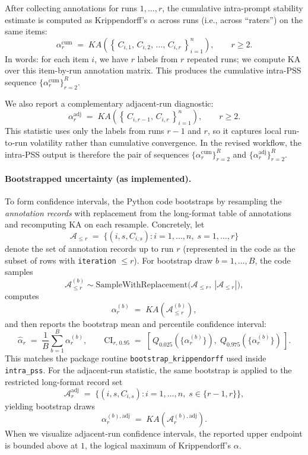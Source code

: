 After collecting annotations for runs $1,\ldots,r$, the cumulative intra-prompt stability estimate is computed as Krippendorff's $\alpha$ across runs (i.e., across ``raters'') on the same items:
\[
\alpha^{\mathrm{cum}}_r
\;=\;
KA\!\left(
\left\{\, C_{i,1},\, C_{i,2},\, \ldots,\, C_{i,r} \,\right\}_{i=1}^{n}
\right),
\qquad r \ge 2.
\]
In words: for each item $i$, we have $r$ labels from $r$ repeated runs; we compute KA over this item-by-run annotation matrix. This produces the cumulative intra-PSS sequence $\{\alpha^{\mathrm{cum}}_r\}_{r=2}^{R}$.

We also report a complementary adjacent-run diagnostic:
\[
\alpha^{\mathrm{adj}}_r
\;=\;
KA\!\left(
\left\{\, C_{i,r-1},\, C_{i,r} \,\right\}_{i=1}^{n}
\right),
\qquad r \ge 2.
\]
This statistic uses only the labels from runs $r-1$ and $r$, so it captures local run-to-run volatility rather than cumulative convergence. In the revised workflow, the intra-PSS output is therefore the pair of sequences $\{\alpha^{\mathrm{cum}}_r\}_{r=2}^{R}$ and $\{\alpha^{\mathrm{adj}}_r\}_{r=2}^{R}$.

\paragraph{Bootstrapped uncertainty (as implemented).}
To form confidence intervals, the Python code bootstraps by resampling the \emph{annotation records} with replacement from the long-format table of annotations and recomputing KA on each resample. Concretely, let
\[
\mathcal{A}_{\le r} \;=\; \{(i, s, C_{i,s}) : i=1,\ldots,n,\; s=1,\ldots,r\}
\]
denote the set of annotation records up to run $r$ (represented in the code as the subset of rows with \texttt{iteration} $\le r$). For bootstrap draw $b=1,\ldots,B$, the code samples
\[
\mathcal{A}^{(b)}_{\le r} \sim \text{SampleWithReplacement}\bigl(\mathcal{A}_{\le r},\ |\mathcal{A}_{\le r}|\bigr),
\]
computes
\[
\alpha^{(b)}_r \;=\; KA\!\left(\mathcal{A}^{(b)}_{\le r}\right),
\]
and then reports the bootstrap mean and percentile confidence interval:
\[
\widehat{\alpha}_r \;=\; \frac{1}{B}\sum_{b=1}^{B}\alpha^{(b)}_r,
\qquad
\text{CI}_{r,\,0.95} \;=\; \left[\, Q_{0.025}(\{\alpha^{(b)}_r\}),\; Q_{0.975}(\{\alpha^{(b)}_r\}) \,\right].
\]
This matches the package routine \texttt{bootstrap\_krippendorff} used inside \texttt{intra\_pss}. For the adjacent-run statistic, the same bootstrap is applied to the restricted long-format record set
\[
\mathcal{A}^{\mathrm{adj}}_{r} \;=\; \{(i, s, C_{i,s}) : i=1,\ldots,n,\; s\in\{r-1,r\}\},
\]
yielding bootstrap draws
\[
\alpha^{(b),\mathrm{adj}}_r \;=\; KA\!\left(\mathcal{A}^{(b),\mathrm{adj}}_{r}\right).
\]
When we visualize adjacent-run confidence intervals, the reported upper endpoint is bounded above at $1$, the logical maximum of Krippendorff's $\alpha$.

